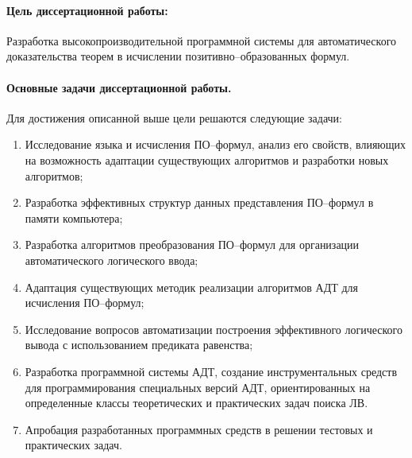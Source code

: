 \paragraph{Цель диссертационной работы:}\hspace{-1em} Разработка высокопроизводительной программной системы для автоматического доказательства теорем в исчислении позитивно--образованных формул.

\paragraph{Основные задачи диссертационной работы.} Для достижения описанной выше цели решаются следующие задачи:
\begin{enumerate}
\item Исследование языка и исчисления ПО--формул, анализ его свойств, влияющих на возможность адаптации существующих алгоритмов и разработки новых алгоритмов;
\item Разработка эффективных структур данных представления ПО--формул в памяти компьютера;
\item Разработка алгоритмов преобразования ПО--формул для организации автоматического логического ввода;
\item Адаптация существующих методик реализации алгоритмов АДТ для исчисления ПО--формул;
\item Исследование вопросов автоматизации построения эффективного логического вывода с использованием предиката равенства;
\item Разработка программной системы АДТ, создание инструментальных средств для программирования специальных версий АДТ, ориентированных на определенные классы теоретических и практических задач поиска ЛВ.
\item Апробация разработанных программных средств в решении тестовых и практических задач.
\end{enumerate}

